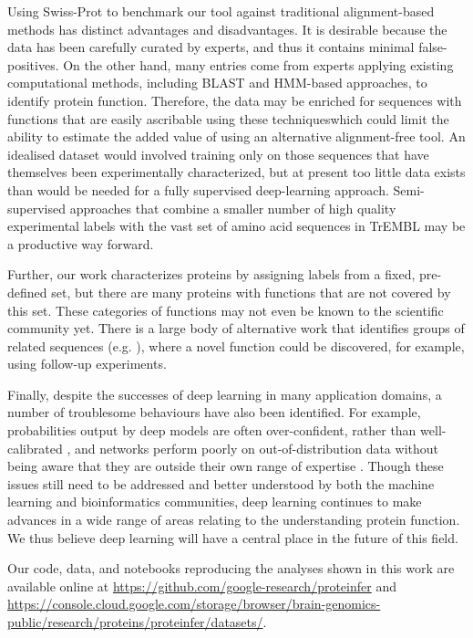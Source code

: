 Using Swiss-Prot to benchmark our tool against traditional alignment-based methods has distinct advantages and disadvantages. It is desirable because the data has been carefully curated by experts, and thus it contains minimal false-positives. On the other hand, many entries come from experts applying existing computational methods, including BLAST and HMM-based approaches, to identify protein function. Therefore, the data may be enriched for sequences with functions that are easily ascribable using these techniqueswhich could limit the ability to estimate the added value of using an alternative alignment-free tool. An idealised dataset would involved training only on those sequences that have themselves been experimentally characterized, but at present  too little data exists than would be needed for a fully supervised deep-learning approach. Semi-supervised approaches that combine a smaller number of high quality experimental labels with the vast set of amino acid sequences in TrEMBL may be a productive way forward.

Further, our work characterizes proteins by assigning labels from a fixed, pre-defined set, but there are many proteins with functions that are not covered by this set. These categories of functions may not even be known to the scientific community yet. There is a large body of alternative work that identifies groups of related sequences (e.g. \cite{pmid12952885}), where a novel function could be discovered, for example, using follow-up experiments.

Finally, despite the successes of deep learning in many application domains, a number of troublesome behaviours have also been identified. For example, probabilities output by deep models are often over-confident, rather than well-calibrated \citep{guo}, and networks perform poorly on out-of-distribution data without being aware that they are outside their own range of expertise \citep{amoidei}. Though these issues still need to be addressed and better understood by both the machine learning and bioinformatics communities, deep learning continues to make advances in a wide range of areas relating to the understanding protein function. We thus believe deep learning will have a central place in the future of this field.



Our code, data, and notebooks reproducing the analyses shown in this work are available online at \url{https://github.com/google-research/proteinfer} and \url{https://console.cloud.google.com/storage/browser/brain-genomics-public/research/proteins/proteinfer/datasets/}.

